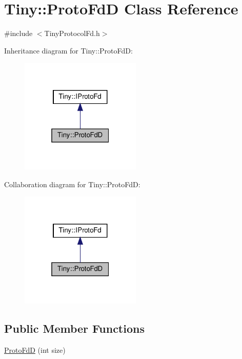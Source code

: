 \hypertarget{classTiny_1_1ProtoFdD}{}\section{Tiny\+:\+:Proto\+FdD Class Reference}
\label{classTiny_1_1ProtoFdD}


{\ttfamily \#include $<$Tiny\+Protocol\+Fd.\+h$>$}



Inheritance diagram for Tiny\+:\+:Proto\+FdD\+:\nopagebreak
\begin{figure}[H]
\begin{center}
\leavevmode
\includegraphics[width=163pt]{classTiny_1_1ProtoFdD__inherit__graph}
\end{center}
\end{figure}


Collaboration diagram for Tiny\+:\+:Proto\+FdD\+:\nopagebreak
\begin{figure}[H]
\begin{center}
\leavevmode
\includegraphics[width=163pt]{classTiny_1_1ProtoFdD__coll__graph}
\end{center}
\end{figure}
\subsection*{Public Member Functions}
\begin{DoxyCompactItemize}
\item 
\hyperlink{classTiny_1_1ProtoFdD_ac6d3b1143cb0776b9ae16e57068f03dc}{Proto\+FdD} (int size)
\end{DoxyCompactItemize}

